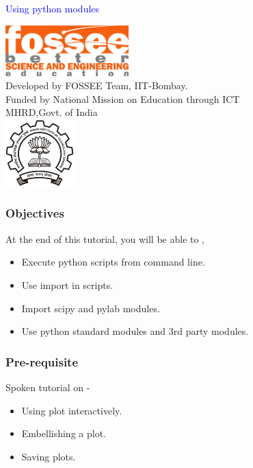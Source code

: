 \documentclass[presentation]{beamer}
\title{}
\author{FOSSEE}
\date{}
\begin{document}
\begin{frame}

\begin{center}
\vspace{12pt}
\textcolor{blue}{\huge Using python modules}
\end{center}
\vspace{18pt}
\begin{center}
\vspace{10pt}
\includegraphics[scale=0.95]{../images/fossee-logo.png}\\
\vspace{5pt}
\scriptsize Developed by FOSSEE Team, IIT-Bombay. \\ 
\scriptsize Funded by National Mission on Education through ICT\\
\scriptsize  MHRD,Govt. of India\\
\includegraphics[scale=0.30]{../images/iitb-logo.png}\\
\end{center}
\end{frame}
\begin{frame}
\frametitle{Objectives}
\label{sec-2}

  At the end of this tutorial, you will be able to ,


\begin{itemize}
\item Execute python scripts from command line.
\item Use import in scripts.
\item Import scipy and pylab modules.
\item Use python standard modules and 3rd party modules.
\end{itemize}
\end{frame}
\begin{frame}
\frametitle{Pre-requisite}
\label{sec-3}

Spoken tutorial on -

\begin{itemize}
\item Using plot interactively.
\item Embellishing a plot.
\item Saving plots.
\end{itemize}
\end{frame}
\end{document}
